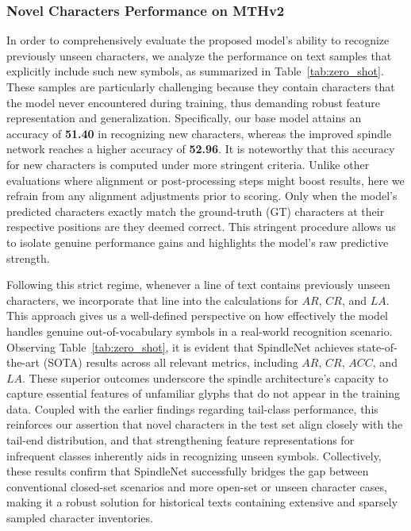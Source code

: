 \subsubsection{Novel Characters Performance on MTHv2} 
 
In order to comprehensively evaluate the proposed model’s ability to recognize previously unseen characters, we analyze the performance on text samples that explicitly include such new symbols, as summarized in Table~\ref{tab:zero_shot}. These samples are particularly challenging because they contain characters that the model never encountered during training, thus demanding robust feature representation and generalization. Specifically, our base model attains an accuracy of \textbf{51.40} in recognizing new characters, whereas the improved spindle network reaches a higher accuracy of \textbf{52.96}. It is noteworthy that this accuracy for new characters is computed under more stringent criteria. Unlike other evaluations where alignment or post-processing steps might boost results, here we refrain from any alignment adjustments prior to scoring. Only when the model’s predicted characters exactly match the ground-truth (GT) characters at their respective positions are they deemed correct. This stringent procedure allows us to isolate genuine performance gains and highlights the model’s raw predictive strength.

Following this strict regime, whenever a line of text contains previously unseen characters, we incorporate that line into the calculations for $AR$, $CR$, and $LA$. This approach gives us a well-defined perspective on how effectively the model handles genuine out-of-vocabulary symbols in a real-world recognition scenario. Observing Table~\ref{tab:zero_shot}, it is evident that SpindleNet achieves state-of-the-art (SOTA) results across all relevant metrics, including $AR$, $CR$, $ACC$, and $LA$. These superior outcomes underscore the spindle architecture’s capacity to capture essential features of unfamiliar glyphs that do not appear in the training data. Coupled with the earlier findings regarding tail-class performance, this reinforces our assertion that novel characters in the test set align closely with the tail-end distribution, and that strengthening feature representations for infrequent classes inherently aids in recognizing unseen symbols. Collectively, these results confirm that SpindleNet successfully bridges the gap between conventional closed-set scenarios and more open-set or unseen character cases, making it a robust solution for historical texts containing extensive and sparsely sampled character inventories.


